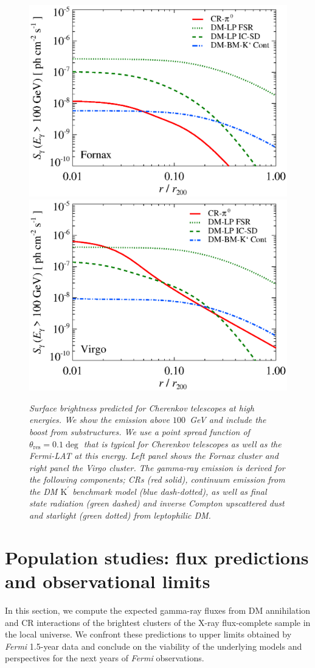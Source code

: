 \documentclass[10pt,aps,pra,reprint,amsmath,amsfonts,amssymb,showpacs,nofootinbib,floatfix]{revtex4-1}
\newcommand{\Fermi}{{\em Fermi}\xspace}
\newcommand{\rmn}{\mathrm}
\newcommand{\psf}{\theta_\rmn{res}}
\newcommand{\Kp}{\rmn{K}^\prime}
\begin{document}
\begin{figure}
\begin{minipage}{2.0\columnwidth}
  \includegraphics[width=0.49\columnwidth]{figures/SB.Fornax.v14.SF700.SubMass.elmu.eps}
  \includegraphics[width=0.49\columnwidth]{figures/SB.Virgo.v14.SF700.SubMass.elmu.eps}
\caption{\it Surface brightness predicted for Cherenkov telescopes at
  high energies. We show the emission above $100$~GeV and include the
  boost from substructures. We use a point spread function of
  $\psf=0.1\deg$ that is typical for Cherenkov
  telescopes as well as the \Fermi-LAT at this energy. Left panel shows
  the Fornax cluster and right panel the Virgo cluster. The gamma-ray
  emission is derived for the following components; CRs (red solid),
  continuum emission from the DM $\Kp$ benchmark model (blue
  dash-dotted), as well as final state radiation (green dashed) and
  inverse Compton upscattered dust and starlight (green dotted) from
  leptophilic DM.}
 \label{fig:SB_IACTs}
\end{minipage}
\end{figure}



\section{Population studies: flux predictions and observational limits}

In this section, we compute the expected gamma-ray fluxes from DM
annihilation and CR interactions of the brightest clusters of the
X-ray flux-complete sample in the local universe. We confront these
predictions to upper limits obtained by \Fermi 1.5-year data and
conclude on the viability of the underlying models and perspectives
for the next years of \Fermi observations.
\end{document}
